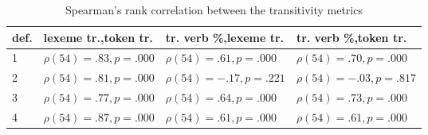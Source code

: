 \begin{table}[ht]{}
    \centering
    \small
    \begin{tabularx}{\textwidth}{lXXX}
      \toprule
      def. & lexeme tr.,\newline token tr. & tr. verb \%,\newline lexeme tr. & tr. verb \%,\newline token tr. \\
      \midrule
      1 & $\rho(54)=.83, p=.000$ & $\rho(54)=.61, p=.000$ & $\rho(54)=.70, p=.000$ \\
      2 & $\rho(54)=.81, p=.000$ & $\rho(54)=-.17, p=.221$ & $\rho(54)=-.03, p=.817$ \\
      3 & $\rho(54)=.77, p=.000$ & $\rho(54)=.64, p=.000$ & $\rho(54)=.73, p=.000$ \\
      4 & $\rho(54)=.87, p=.000$ & $\rho(54)=.61, p=.000$ & $\rho(54)=.61, p=.000$ \\
      \bottomrule
    \end{tabularx}
    \caption{Spearman's rank correlation between the transitivity metrics}\label{tab:transitivity_spearmanr} 
\end{table}  